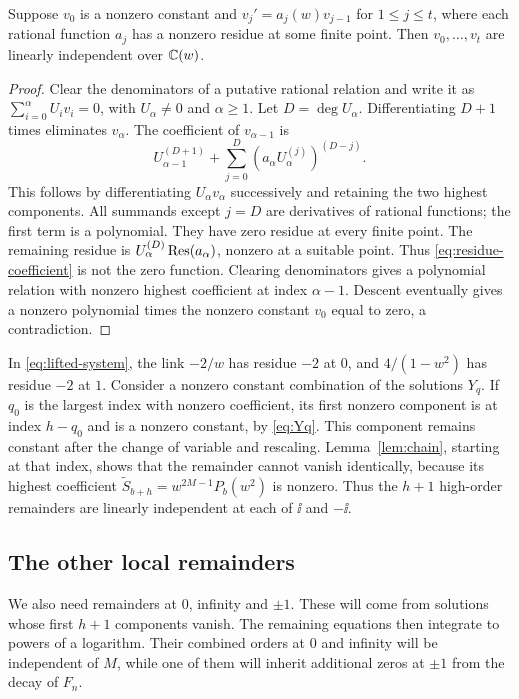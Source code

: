 \begin{lemma}\label{lem:chain}
Suppose $v_0$ is a nonzero constant and
$v_j'=a_j(w)v_{j-1}$ for $1\leq j\leq t$, where each rational function
$a_j$ has a nonzero residue at some finite point.
Then $v_0,\ldots,v_t$ are linearly independent over $\mathbb C(w)$.
\end{lemma}

\begin{proof}
Clear the denominators of a putative rational relation and write it as
$\sum_{i=0}^{\alpha}U_i v_i=0$, with $U_\alpha\neq0$ and $\alpha\geq1$.
Let $D=\deg U_\alpha$. Differentiating $D+1$ times eliminates
$v_\alpha$. The coefficient of $v_{\alpha-1}$ is
\begin{equation}\label{eq:residue-coefficient}
 U_{\alpha-1}^{(D+1)}
   +\sum_{j=0}^{D}(a_\alpha U_\alpha^{(j)})^{(D-j)}.
\end{equation}
This follows by differentiating $U_\alpha v_\alpha$ successively and
retaining the two highest components.
All summands except $j=D$ are derivatives of rational functions; the
first term is a polynomial. They have zero residue at every finite point.
The remaining residue is $U_\alpha^{(D)}\operatorname{Res}(a_\alpha)$, nonzero at a
suitable point. Thus \eqref{eq:residue-coefficient} is not the zero
function. Clearing denominators gives a polynomial relation with
nonzero highest coefficient at index $\alpha-1$.
Descent eventually gives a nonzero polynomial times the nonzero
constant $v_0$ equal to zero, a contradiction.
\end{proof}

In \eqref{eq:lifted-system}, the link $-2/w$ has residue $-2$ at $0$,
and $4/(1-w^2)$ has residue $-2$ at $1$.
Consider a nonzero constant combination of the solutions $Y_q$.
If $q_0$ is the largest index with nonzero coefficient, its first
nonzero component is at index $h-q_0$ and is a nonzero constant,
by \eqref{eq:Yq}. This component remains constant after the change
of variable and rescaling.
Lemma~\ref{lem:chain}, starting at that index, shows that the remainder
cannot vanish identically, because its highest coefficient
$\widetilde S_{b+h}=w^{2M-1}P_b(w^2)$ is nonzero.
Thus the $h+1$ high-order remainders are linearly independent at
each of $\ii$ and $-\ii$.

\subsection{The other local remainders}

We also need remainders at $0$, infinity and $\pm1$. These will come from
solutions whose first $h+1$ components vanish. The remaining equations
then integrate to powers of a logarithm. Their combined orders at $0$
and infinity will be independent of $M$, while one of them will inherit
additional zeros at $\pm1$ from the decay of $F_n$.

